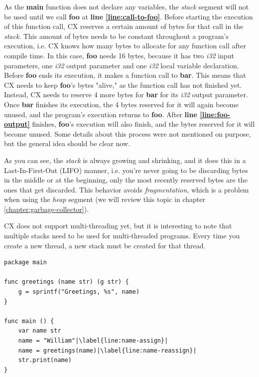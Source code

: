 \documentclass[11pt,fleqn,openany]{book} %
\begin{document}
As the \textbf{main} function does not declare any variables, the \emph{stack} segment will not be used until we call \textbf{foo} at \textbf{line \ref{line:call-to-foo}}. Before starting the execution of this function call, CX reserves a certain amount of bytes for that call in the \emph{stack}. This amount of bytes needs to be constant throughout a program's execution, i.e. CX knows how many bytes to allocate for any function call after compile time. In this case, \textbf{foo} needs 16 bytes, because it has two \emph{i32} input parameters, one \emph{i32} output parameter and one \emph{i32} local variable declaration. Before \textbf{foo} ends its execution, it makes a function call to \textbf{bar}. This means that CX needs to keep \textbf{foo}'s bytes "alive," as the function call has not finished yet. Instead, CX needs to reserve 4 more bytes for \textbf{bar} for its \emph{i32} output parameter. Once \textbf{bar} finishes its execution, the 4 bytes reserved for it will again become unused, and the program's execution returns to \textbf{foo}. After \textbf{line \ref{line:foo-output}} finishes, \textbf{foo}'s execution will also finish, and  the bytes reserved for it will become unused. Some details about this process were not mentioned on purpose, but the general idea should be clear now.

As you can see, the \emph{stack} is always growing and shrinking, and it does this in a Last-In-First-Out (LIFO) manner, i.e. you're never going to be discarding bytes in the middle or at the beginning, only the most recently reserved bytes are the ones that get discarded. This behavior avoids \emph{fragmentation}, which is a problem when using the \emph{heap} segment (we will review this topic in chapter \ref{chapter:garbage-collector}).

CX does not support multi-threading yet, but it is interesting to note that multiple stacks need to be used for multi-threaded programs. Every time you create a new thread, a new stack must be created for that thread.

\begin{lstlisting}[caption={Example of heap usage for strings},captionpos=b,label={listing:strings-heap}]
package main

func greetings (name str) (g str) {
	g = sprintf("Greetings, %s", name)
}

func main () {
	var name str
	name = "William"|\label{line:name-assign}|
	name = greetings(name)|\label{line:name-reassign}|
	str.print(name)
}
\end{lstlisting}
\end{document}
